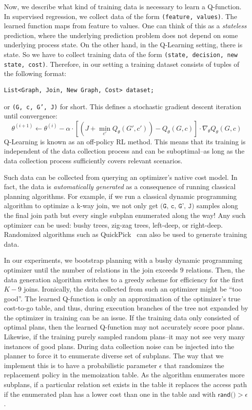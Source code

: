 Now, we describe what kind of training data is necessary to learn a Q-function. In supervised regression, we collect data of the form \texttt{(feature, values)}. The learned function maps from feature to values. One can think of this as a \emph{stateless} prediction, where the underlying prediction problem does not depend on some underlying process state. On the other hand, in the Q-Learning setting, there is state. So we have to collect training data of the form \texttt{(state, decision, new state, cost)}. Therefore, in our setting a training dataset consists of tuples of the following format:
\begin{lstlisting}
List<Graph, Join, New Graph, Cost> dataset;
\end{lstlisting}
or \texttt{(G, c, G', J)} for short. This defines a stochastic gradient descent iteration until convergence:
\[
\theta^{(i+1)} \leftarrow \theta^{(i)} - \alpha \cdot [ (J + \min_{c'} Q_\theta(G',c')) - Q_\theta(G,c) ] \cdot \nabla_\theta Q_\theta(G,c) 
\]
Q-Learning is known as an off-policy RL method. This means that its training is independent of the data collection process and can be suboptimal--as long as the data collection process sufficiently covers relevant scenarios. 

Such data can be collected from querying an optimizer's native cost model. In fact, the data is \emph{automatically generated} as a consequence of running classical planning algorithms. For example, if we run a classical dynamic programming algorithm to optimize a k-way join, we not only get $\texttt{(G, c, G', J)}$ samples along the final join path but every single subplan enumerated along the way! Any such optimizer can be used: bushy trees, zig-zag trees, left-deep, or right-deep. Randomized algorithms such as QuickPick~\cite{waas2000join} can also be used to generate training data. 

In our experiments, we bootstrap planning with a bushy dynamic programming optimizer until the number of relations in the join exceeds 9 relations.  Then, the data generation algorithm switches to a greedy scheme for efficiency for the first $K-9$ joins.
Ironically, the data collected from such an optimizer might be ``too good''.
The learned Q-function is only an approximation of the optimizer's true cost-to-go table, and thus, during execution branches of the tree not expanded by the optimizer in training can be an issue.
If the training data only consisted of optimal plans, then the learned Q-function may not accurately score poor plans. Likewise, if the training purely sampled random plans--it may not see very many instances of good plans.
During data collection noise can be injected into the planner to force it to enumerate diverse set of subplans.
The way that we implement this is to have a probabilistic parameter $\epsilon$ that randomizes the replacement policy in the memoization table.
As the algorithm enumerates more subplans, if a particular relation set exists in the table it replaces the access path if the enumerated plan has a lower cost than one in the table and with $\textsf{rand()} > \epsilon$.


